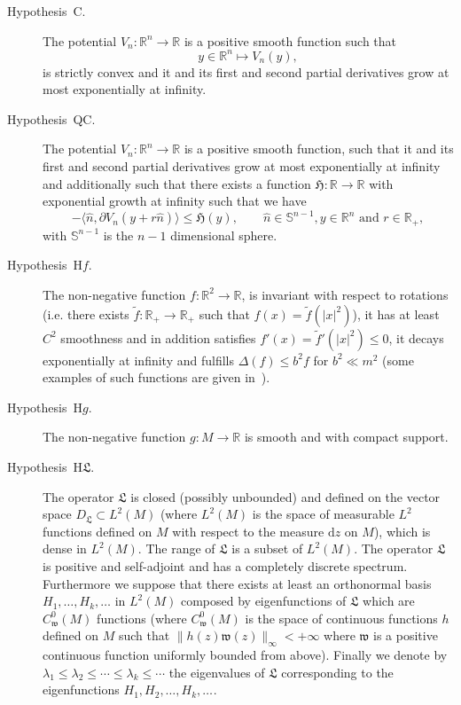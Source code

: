 \documentclass[a4paper,10pt]{article}
\newcommand{\mathd}{\mathrm{d}}
\newcommand{\descriptionparagraphs}[1]{\begin{description}#1\end{description}}
\begin{document}
{\descriptionparagraphs{
  \item[Hypothesis~C.] The potential $V_n : \mathbb{R}^n \rightarrow
  \mathbb{R}$ is a positive smooth function such that
  \[ y \in \mathbb{R}^n \mapsto V_n (y), \]
  is strictly convex and it and its first and second partial derivatives grow
  at most exponentially at infinity.
  
  \item[Hypothesis~QC.] The potential $V_n : \mathbb{R}^n \rightarrow
  \mathbb{R}$ is a positive smooth function, such that it and its first and
  second partial derivatives grow at most exponentially at infinity and
  additionally such that there exists a function $\mathfrak{H} : \mathbb{R}
  \rightarrow \mathbb{R}$ with exponential growth at infinity such that we
  have
  \[ - \langle \hat{n}, \partial V_n (y + r \hat{n}) \rangle \leqslant
     \mathfrak{H} (y), \qquad \text{$\hat{n} \in \mathbb{S}^{n - 1}, y \in
     \mathbb{R}^n$ and $r \in \mathbb{R}_+$}, \]
  with $\mathbb{S}^{n - 1}$ is the $n - 1$ dimensional sphere.
  
  \item[Hypothesis~H$f$.] The non-negative function $f : \mathbb{R}^2
  \rightarrow \mathbb{R}$, is invariant with respect to rotations (i.e. there
  exists $\tilde{f} : \mathbb{R}_+ \rightarrow \mathbb{R}_+$ such that $f (x)
  = \tilde{f} (| x |^2)$), it has at least $C^2$ smoothness and in addition
  satisfies $f' (x) = \tilde{f}' (| x |^2) \leqslant 0$, it decays
  exponentially at infinity and fulfills $\Delta (f) \leqslant b^2 f$ for $b^2
  \ll m^2$ (some examples of such functions are given in~{\cite{Klein1984}}).
  
  \item[Hypothesis~H$g$.] The non-negative function $g : M \rightarrow
  \mathbb{R}$ is smooth and with compact support.
  
  \item[Hypothesis~H$\mathfrak{L}$.] The operator $\mathfrak{L}$ is closed
  (possibly unbounded) and defined on the vector space $D_{\mathfrak{L}}
  \subset L^2 (M)$ (where $L^2 (M)$ is the space of measurable $L^2$ functions
  defined on $M$ with respect to the measure $\mathd z$ on $M$), which is
  dense in $L^2 (M)$. The range of $\mathfrak{L}$ is a subset of $L^2 (M)$.
  The operator $\mathfrak{L}$ is positive and self-adjoint and has a
  completely discrete spectrum. Furthermore we suppose that there exists at
  least an orthonormal basis $H_1, \ldots, H_k, \ldots$ in $L^2 (M)$ composed
  by eigenfunctions of $\mathfrak{L}$ which are $C^0_{\mathfrak{w}} (M)$
  functions (where $C^0_{\mathfrak{w}} (M)$ is the space of continuous
  functions $h$ defined on $M$ such that $\| h (z) \mathfrak{w} (z)
  \|_{\infty} < + \infty$ where $\mathfrak{w}$ is a positive continuous
  function uniformly bounded from above). Finally we denote by $\lambda_1
  \leqslant \lambda_2 \leqslant \cdots \leqslant \lambda_k \leqslant \cdots$
  the eigenvalues of $\mathfrak{L}$ corresponding to the eigenfunctions $H_1,
  H_2, \ldots, H_k, \ldots_{}$.
  
}}
\end{document}
